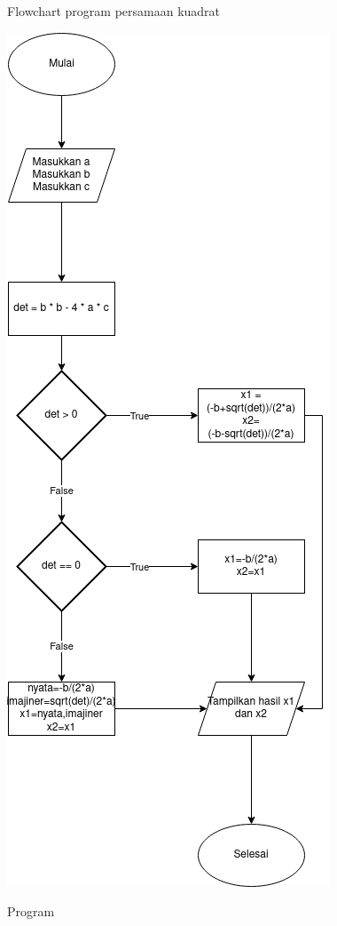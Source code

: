 \documentclass[a4paper,12pt]{article}
\begin{document}
   \newpage
   Flowchart program persamaan kuadrat
   \begin{center}
      \includegraphics[scale=.5]{Numerik04.png}
   \end{center}
\newpage
   Program
\end{document}
